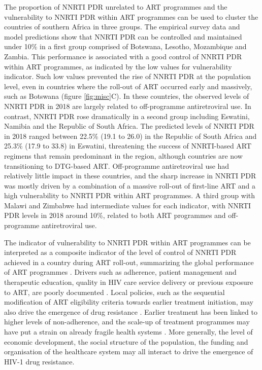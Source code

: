 \documentclass{article}
\begin{document}
The proportion of NNRTI PDR unrelated to ART programmes and the vulnerability to NNRTI PDR within ART programmes can be used to cluster the countries of southern Africa in three groups. The empirical survey data and model predictions show that NNRTI PDR can be controlled and maintained under 10\% in a first group comprised of Botswana, Lesotho, Mozambique and Zambia. This performance is associated with a good control of NNRTI PDR within ART programmes, as indicated by the low values for vulnerability indicator. Such low values prevented the rise of NNRTI PDR  at the population level, even in countries where the roll-out of ART occurred early and massively, such as Botswana (figure \ref{fig:misc}C). In these countries, the observed levels of NNRTI PDR in 2018 are largely related to off-programme antiretroviral use. 
In contrast, NNRTI PDR rose dramatically in a second group including Eswatini, Namibia and the Republic of South Africa. The predicted levels of NNRTI PDR in 2018 ranged between 22.5\% (19.1 to 26.0) in the Republic of South Africa and 25.3\% (17.9 to 33.8) in Eswatini, threatening the success of NNRTI-based ART regimens that remain predominant in the region, although countries are now transitioning to DTG-based ART. Off-programme antiretroviral use had relatively little impact in these countries, and the sharp increase in NNRTI PDR was mostly driven by a combination of a massive roll-out of first-line ART and a high vulnerability to NNRTI PDR within ART programmes. A third group with Malawi and Zimbabwe had intermediate values for each indicator, with NNRTI PDR levels in 2018 around 10\%, related to both ART programmes and off-programme antiretroviral use.

The indicator of vulnerability to NNRTI PDR within ART programmes can be interpreted as a composite indicator of the level of control of NNRTI PDR achieved in a country during ART roll-out, summarizing the global performance of ART programmes \cite{hamers2018hiv}. Drivers such as adherence, patient management and therapeutic education,  quality in HIV care service delivery or previous exposure to ART, are poorly documented \cite{clavel2004hiv,kepler1998drug}. Local policies, such as the sequential modification of ART eligibility criteria  towards earlier treatment initiation, may also drive the emergence of drug resistance \cite{de2018hiv}. Earlier treatment has been linked to higher levels of non-adherence, and the scale-up of treatment programmes may have put a strain on already fragile health systems \cite{nachega2014addressing}. More generally, the level of economic development, the social structure of the population, the funding and organisation of the healthcare system may all interact to drive the emergence of HIV-1 drug resistance. 
\end{document}

